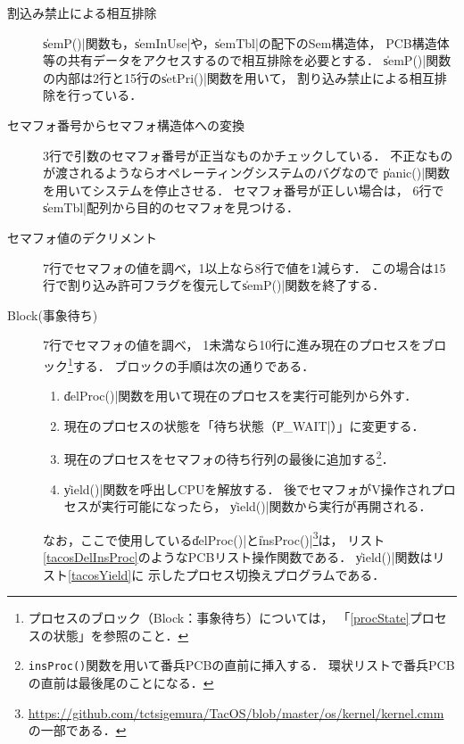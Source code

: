 \begin{description}
\item [割込み禁止による相互排除]
  \|semP()|関数も，\|semInUse|や，\|semTbl|の配下のSem構造体，
  PCB構造体等の共有データをアクセスするので相互排除を必要とする．
  \|semP()|関数の内部は2行と15行の\|setPri()|関数を用いて，
  割り込み禁止による相互排除を行っている．

\item [セマフォ番号からセマフォ構造体への変換]
  3行で引数のセマフォ番号が正当なものかチェックしている．
  不正なものが渡されるようならオペレーティングシステムのバグなので
  \|panic()|関数を用いてシステムを停止させる．
  セマフォ番号が正しい場合は，
  6行で\|semTbl|配列から目的のセマフォを見つける．

\item [セマフォ値のデクリメント]
  7行でセマフォの値を調べ，1以上なら8行で値を1減らす．
  この場合は15行で割り込み許可フラグを復元して\|semP()|関数を終了する．

\item [Block(事象待ち)]
  7行でセマフォの値を調べ，
  1未満なら10行に進み現在のプロセスをブロック\footnote{
    プロセスのブロック（Block：事象待ち）については，
    「\ref{procState}プロセスの状態」を参照のこと．}する．
  ブロックの手順は次の通りである．

  \begin{enumerate}
  \item \|delProc()|関数を用いて現在のプロセスを実行可能列から外す．
  \item 現在のプロセスの状態を「待ち状態（\|P_WAIT|）」に変更する．
  \item 現在のプロセスをセマフォの待ち行列の最後に追加する\footnote{
    \texttt{insProc()}関数を用いて番兵PCBの直前に挿入する．
    環状リストで番兵PCBの直前は最後尾のことになる．}．
  \item \|yield()|関数を呼出しCPUを解放する．
    後でセマフォがV操作されプロセスが実行可能になったら，
    \|yield()|関数から実行が再開される．
  \end{enumerate}

  なお，ここで使用している\|delProc()|と\|insProc()|\footnote{
  \url{https://github.com/tctsigemura/TacOS/blob/master/os/kernel/kernel.cmm}
  の一部である．}は，
  リスト\ref{tacosDelInsProc}のようなPCBリスト操作関数である．
  \|yield()|関数はリスト\ref{tacosYield}に
  示したプロセス切換えプログラムである．

  
\end{description}

